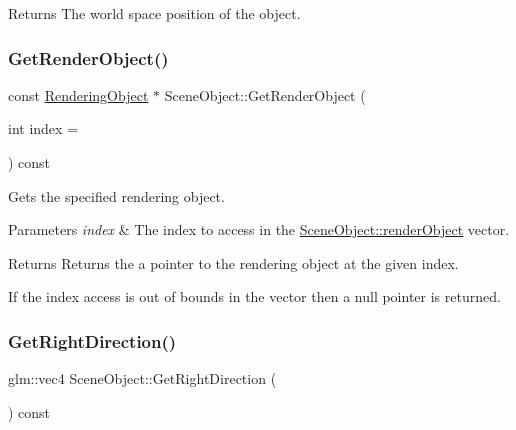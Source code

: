 \begin{DoxyReturn}{Returns}
The world space position of the object. 
\end{DoxyReturn}
\hypertarget{class_scene_object_a0cfa0bb4dbb0f56900ce431cb5dbdda9}{}\label{class_scene_object_a0cfa0bb4dbb0f56900ce431cb5dbdda9} 
\subsubsection{\texorpdfstring{Get\+Render\+Object()}{GetRenderObject()}}
{\footnotesize\ttfamily const \hyperlink{class_rendering_object}{Rendering\+Object} $\ast$ Scene\+Object\+::\+Get\+Render\+Object (\begin{DoxyParamCaption}\item[{int}]{index = {} }\end{DoxyParamCaption}) const\hspace{0.3cm}{\ttfamily [virtual]}}



Gets the specified rendering object. 


\begin{DoxyParams}{Parameters}
{\em index} & The index to access in the \hyperlink{class_scene_object_a4bbf98a19bd8e7ddd491fbb9a41b42cf}{Scene\+Object\+::render\+Object} vector. \\
\hline
\end{DoxyParams}
\begin{DoxyReturn}{Returns}
Returns the a pointer to the rendering object at the given index.
\end{DoxyReturn}
If the index access is out of bounds in the vector then a null pointer is returned. \hypertarget{class_scene_object_a32985db85bba159afde18da0a16b3934}{}\label{class_scene_object_a32985db85bba159afde18da0a16b3934} 
\subsubsection{\texorpdfstring{Get\+Right\+Direction()}{GetRightDirection()}}
{\footnotesize\ttfamily glm\+::vec4 Scene\+Object\+::\+Get\+Right\+Direction (\begin{DoxyParamCaption}{ }\end{DoxyParamCaption}) const\hspace{0.3cm}{\ttfamily [virtual]}}



